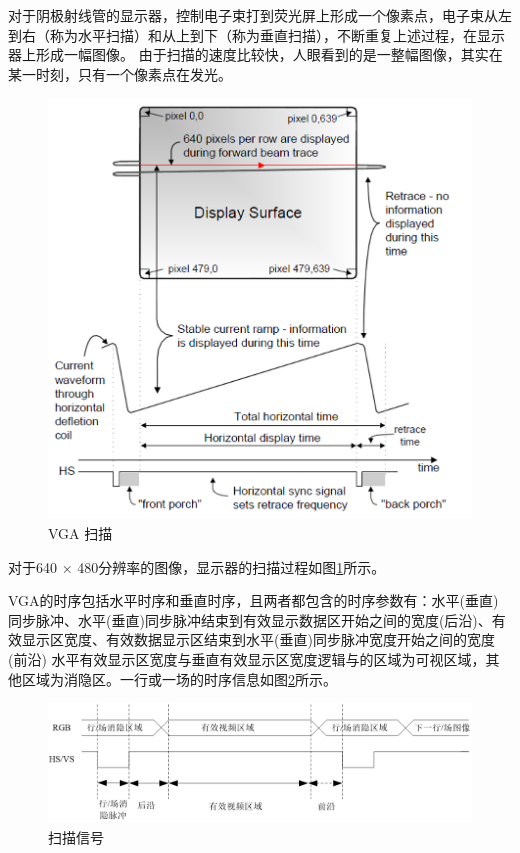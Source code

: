 \documentclass{ctexart}
\begin{document}
            对于阴极射线管的显示器，控制电子束打到荧光屏上形成一个像素点，电子束从左到右（称为水平扫描）和从上到下（称为垂直扫描），不断重复上述过程，在显示器上形成一幅图像。
            由于扫描的速度比较快，人眼看到的是一整幅图像，其实在某一时刻，只有一个像素点在发光。
            \begin{figure}
\centering
\includegraphics[width=1\linewidth]{report2-vga-scan1}
\caption{VGA 扫描}
\label{fig:report2-vga-scan1}
            \end{figure}

            对于640 × 480分辨率的图像，显示器的扫描过程如图\ref{fig:report2-vga-scan1}所示。
            
            VGA的时序包括水平时序和垂直时序，且两者都包含的时序参数有：水平(垂直)同步脉冲、水平(垂直)同步脉冲结束到有效显示数据区开始之间的宽度(后沿)、有效显示区宽度、有效数据显示区结束到水平(垂直)同步脉冲宽度开始之间的宽度(前沿)
            水平有效显示区宽度与垂直有效显示区宽度逻辑与的区域为可视区域，其他区域为消隐区。一行或一场的时序信息如图\ref{fig:report2-vga-scan2}所示。
            \begin{figure}
\centering
\includegraphics[width=1\linewidth]{report2-vga-scan2}
\caption{扫描信号}
\label{fig:report2-vga-scan2}
            \end{figure}
            
\end{document}
